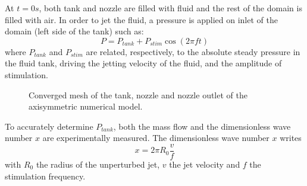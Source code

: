 \documentclass[twocolumn,10pt]{asme2ej}
\begin{document}
At $t=0s$, both tank and nozzle are filled with fluid and the rest of the domain is filled with air. In order to jet the fluid, a pressure is applied on inlet of the domain (left side of the tank) such as:
\begin{equation} \label{eq:plim}
    P=P_{tank}+P_{stim}\cos(2\pi f t)
\end{equation}
where $P_{tank}$ and $P_{stim}$ are related, respectively, to the absolute steady pressure in the fluid tank, driving the jetting velocity of the fluid, and the amplitude of stimulation.
\begin{figure}[h]
    \centering    
    \caption{Converged mesh of the tank, nozzle and nozzle outlet of the axisymmetric numerical model.} 
    \label{fig:meshGlycerol}
\end{figure}

To accurately determine $P_{tank}$, both the mass flow and the dimensionless wave number $x$ are experimentally measured. The dimensionless wave number $x$ writes
\begin{equation}
    x=2 \pi R_0 \frac{v}{f}
\end{equation}
with $R_0$ the radius of the unperturbed jet, $v$ the jet velocity and $f$ the stimulation frequency. 
\end{document}
